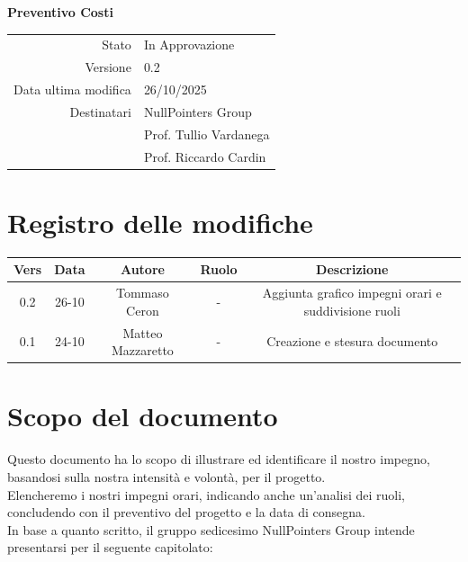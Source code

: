 \documentclass{article}
\begin{document}
	\vspace{2cm}
	
	{
		\centering
		\Huge\bfseries Preventivo Costi\par
		\vspace{0.5cm}
	}
	
	\begin{center}
		\begin{tabular}{r|l}
			Stato & In Approvazione \\
			Versione & 0.2 \\
			Data ultima modifica & 26/10/2025 \\
			Destinatari & NullPointers Group \\
			& Prof. Tullio Vardanega \\
			& Prof. Riccardo Cardin \\
		\end{tabular}
	\end{center}
	
	\newpage
	\section{Registro delle modifiche}
	
	\begin{table}[htbp]
		\begin{tabular}{|c|c|c|c|c|}
			\hline
			\rowcolor[gray]{0.9}
			Vers & Data & Autore & Ruolo & Descrizione \\
			\hline
			0.2 & 26-10 & Tommaso Ceron & - & Aggiunta grafico impegni orari e suddivisione ruoli\\
			\hline
			0.1 & 24-10 & Matteo Mazzaretto & - & Creazione e stesura documento \\
			\hline
		\end{tabular}
	\end{table}
	
	\newpage
	
	\section{Scopo del documento}
	Questo documento ha lo scopo di illustrare ed identificare il nostro impegno, basandosi sulla nostra intensità e volontà, per il progetto.\\
	Elencheremo i nostri impegni orari, indicando anche un'analisi dei ruoli, concludendo con il preventivo del progetto e la data di consegna.\\
	In base a quanto scritto, il gruppo sedicesimo NullPointers Group intende presentarsi per il seguente capitolato:\\
	\begin{center}
		
	\end{center}
	
\end{document}
